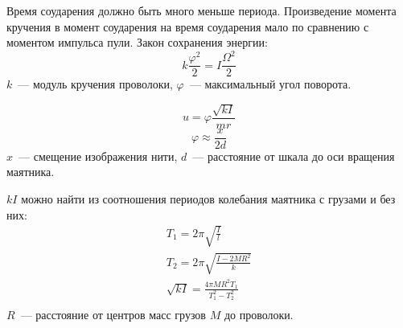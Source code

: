 Время соударения должно быть много меньше периода. Произведение момента кручения в момент
соударения на время соударения мало по сравнению с моментом импульса пули. Закон сохранения
энергии:
\[k\frac{\varphi^2}{2}=I\frac{\Omega^2}{2}\]
$k$~--- модуль кручения проволоки, $\varphi$~--- максимальный угол поворота.

\[u=\varphi\frac{\sqrt{kI}}{mr}\]
\[\varphi\approx\frac{x}{2d}\]
$x$~--- смещение изображения нити, $d$~--- расстояние от шкала до оси вращения маятника.

$kI$ можно найти из соотношения периодов колебания маятника с грузами и без них:
\begin{gather*}
    T_1=2\pi\sqrt{\frac{I}{l}}\\
    T_2=2\pi\sqrt{\frac{I-2MR^2}{k}}\\
    \sqrt{kI} = \frac{4\pi MR^2T_1}{T_1^2-T_2^2}\\
\end{gather*}
$R$~--- расстояние от центров масс грузов $M$ до проволоки.
